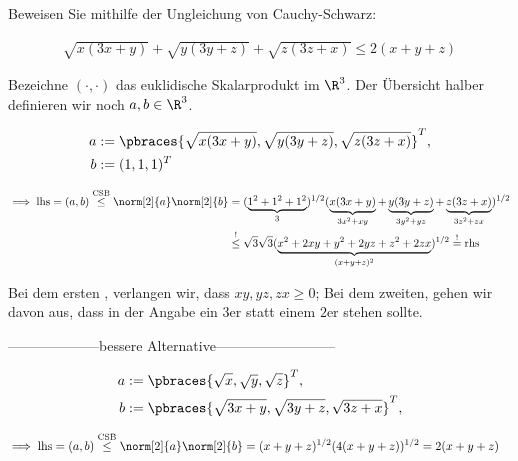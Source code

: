 
\begin{exercise}

Beweisen Sie mithilfe der Ungleichung von Cauchy-Schwarz:

\begin{align*}
    \sqrt{x (3x + y)} + \sqrt{y (3y + z)} + \sqrt{z (3z + x)}
    \leq
    2 (x + y + z)
\end{align*}

\end{exercise}


\begin{solution}

Bezeichne $(\cdot, \cdot)$ das euklidische Skalarprodukt im $\R^3$.
Der Übersicht halber definieren wir noch $a, b \in \R^3$.

\begin{align*}
    a & := \pbraces
    {
        \sqrt{x (3x + y)},
        \sqrt{y (3y + z)},
        \sqrt{z (3z + x)}
    }^T, \\
    b & := (1, 1, 1)^T
\end{align*}

\begin{align*}
    \implies
    \text{lhs}
    =
    (a, b)
    \stackrel{\text{CSB}}{\leq}
    \norm[2]{a} \norm[2]{b}
    & =
    (
        \underbrace
        {1^2 + 1^2 + 1^2}_{3}
    )^{1/2}
    (
        \underbrace{x (3x + y)}_{3x^2 + xy}
        +
        \underbrace{y (3y + z)}_{3y^2 + yz}
        +
        \underbrace{z (3z + x)}_{3z^2 + zx}
    )^{1/2} \\
    & \stackrel{!}{\leq}
    \sqrt{3} \sqrt{3}
    (
        \underbrace
        {x^2 + 2xy + y^2 + 2yz + z^2 + 2zx}_{(x + y + z)^2}
    )^{1/2}
    \stackrel{!}{=}
    \text{rhs}
\end{align*}

Bei dem ersten \Quote{!}, verlangen wir, dass $xy, yz, zx \geq 0$;
Bei dem zweiten, gehen wir davon aus, dass in der Angabe ein $3$er statt einem $2$er stehen sollte.


--------------------bessere Alternative--------------------------

\begin{align*}
    a & := \pbraces
    {
        \sqrt{x},
        \sqrt{y},
        \sqrt{z}
    }^T, \\
    b & := \pbraces
    {
        \sqrt{3x + y},
        \sqrt{3y + z},
        \sqrt{3z + x}
    }^T, \\
\end{align*}

\begin{align*}
    \implies
    \text{lhs}
    =
    (a, b)
    \stackrel{\text{CSB}}{\leq}
    \norm[2]{a} \norm[2]{b}
    & =
    (x + y + z)^{1/2}
    (4(x+y+z)
    )^{1/2} = 2(x+y+z)
\end{align*}


\end{solution}


